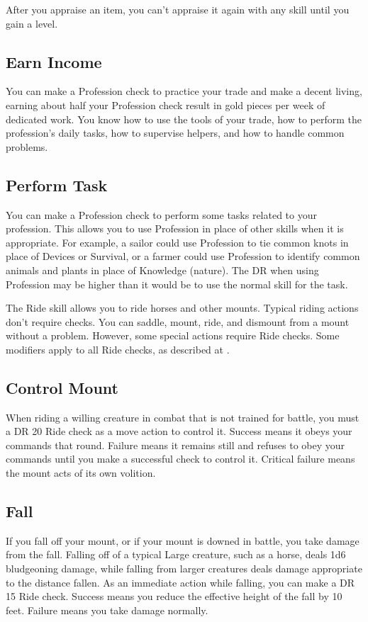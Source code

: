         After you appraise an item, you can't appraise it again with any skill until you gain a level.

    \subsection{Earn Income}
        You can make a Profession check to practice your trade and make a decent living, earning about half your Profession check result in gold pieces per week of dedicated work. You know how to use the tools of your trade, how to perform the profession's daily tasks, how to supervise helpers, and how to handle common problems.

    \subsection{Perform Task}
        You can make a Profession check to perform some tasks related to your profession. This allows you to use Profession in place of other skills when it is appropriate. For example, a sailor could use Profession to tie common knots in place of Devices or Survival, or a farmer could use Profession to identify common animals and plants in place of Knowledge (nature). The DR when using Profession may be higher than it would be to use the normal skill for the task.

        The Ride skill allows you to ride horses and other mounts. Typical riding actions don't require checks. You can saddle, mount, ride, and dismount from a mount without a problem. However, some special actions require Ride checks. Some modifiers apply to all Ride checks, as described at .

    \subsection{Control Mount}
        When riding a willing creature in combat that is not trained for battle, you must a DR 20 Ride check as a move action to control it. Success means it obeys your commands that round. Failure means it remains still and refuses to obey your commands until you make a successful check to control it. Critical failure means the mount acts of its own volition.

    \subsection{Fall}
        If you fall off your mount, or if your mount is downed in battle, you take damage from the fall. Falling off of a typical Large creature, such as a horse, deals 1d6 bludgeoning damage, while falling from larger creatures deals damage appropriate to the distance fallen. As an immediate action while falling, you can make a DR 15 Ride check. Success means you reduce the effective height of the fall by 10 feet. Failure means you take damage normally.

